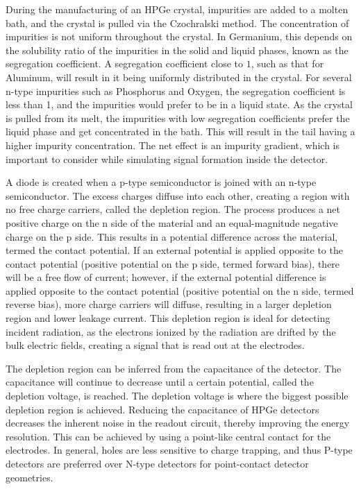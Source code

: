 During the manufacturing of an HPGe crystal, impurities are added to a molten bath, and the crystal is pulled via the Czochralski method. The concentration of impurities is not uniform throughout the crystal. In Germanium, this depends on the solubility ratio of the impurities in the solid and liquid phases, known as the segregation coefficient. A segregation coefficient close to $1$, such as that for Aluminum, will result in it being uniformly distributed in the crystal. For several n-type impurities such as Phosphorus and Oxygen, the segregation coefficient is less than 1, and the impurities would prefer to be in a liquid state. As the crystal is pulled from its melt, the impurities with low segregation coefficients prefer the liquid phase and get concentrated in the bath. This will result in the tail having a higher impurity concentration. The net effect is an impurity gradient, which is important to consider while simulating signal formation inside the detector.

A diode is created when a p-type semiconductor is joined with an n-type semiconductor. The excess charges diffuse into each other, creating a region with no free charge carriers, called the depletion region. The process produces a net positive charge on the n side of the material and an equal-magnitude negative charge on the p side. This results in a potential difference across the material, termed the contact potential. If an external potential is applied opposite to the contact potential (positive potential on the p side, termed forward bias), there will be a free flow of current; however, if the external potential difference is applied opposite to the contact potential (positive potential on the n side, termed reverse bias), more charge carriers will diffuse, resulting in a larger depletion region and lower leakage current. This depletion region is ideal for detecting incident radiation, as the electrons ionized by the radiation are drifted by the bulk electric fields, creating a signal that is read out at the electrodes.

The depletion region can be inferred from the capacitance of the detector. The capacitance will continue to decrease until a certain potential, called the depletion voltage, is reached. The depletion voltage is where the biggest possible depletion region is achieved. Reducing the capacitance of HPGe detectors decreases the inherent noise in the readout circuit, thereby improving the energy resolution. This can be achieved by using a point-like central contact for the electrodes. In general, holes are less sensitive to charge trapping, and thus P-type detectors are preferred over N-type detectors for point-contact detector geometries.

